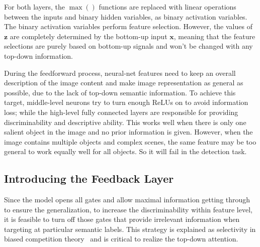 For both layers, the $\max()$ functions are replaced with linear operations between the inputs and binary hidden variables, as binary activation variables. The binary activation variables perform feature selection. However, the values of $\mathbf{z}$ are completely determined by the bottom-up input $\mathbf{x}$, meaning that the feature selections are purely based on bottom-up signals and won't be changed with any top-down information.

During the feedforward process, neural-net features need to keep an overall description of the image content and make image representation as general as possible, due to the lack of top-down semantic information. To achieve this target, middle-level neurons try to turn enough ReLUs on to avoid information loss; while the high-level fully connected layers are responsible for providing discriminability and descriptive ability. This works well when there is only one salient object in the image and no prior information is given. However, when the image contains multiple objects and complex scenes, the same feature may be too general to work equally well for all objects. So it will fail in the detection task.


\subsection{Introducing the Feedback Layer}
Since the model opens all gates and allow maximal information getting through to ensure the generalization, to increase the discriminability within feature level, it is feasible to turn off those gates that provide irrelevant information when targeting at particular semantic labels. This strategy is explained as selectivity in biased competition theory~\cite{desimone1995neural} and is critical to realize the top-down attention.

